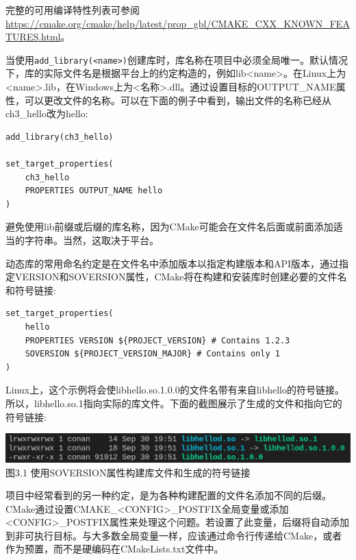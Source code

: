 完整的可用编译特性列表可参阅\url{https://cmake.org/cmake/help/latest/prop_gbl/CMAKE\_CXX\_KNOWN\_FEATURES.html}。


当使用\texttt{add\_library(<name>)}创建库时，库名称在项目中必须全局唯一。默认情况下，库的实际文件名是根据平台上的约定构造的，例如lib<name>。在Linux上为<name>.lib，在Windows上为<名称>.dll。通过设置目标的OUTPUT\_NAME属性，可以更改文件的名称。可以在下面的例子中看到，输出文件的名称已经从ch3\_hello改为hello:

\begin{lstlisting}[style=styleCMake]
add_library(ch3_hello)

set_target_properties(
	ch3_hello
	PROPERTIES OUTPUT_NAME hello
)
\end{lstlisting}

避免使用lib前缀或后缀的库名称，因为CMake可能会在文件名后面或前面添加适当的字符串。当然，这取决于平台。

动态库的常用命名约定是在文件名中添加版本以指定构建版本和API版本，通过指定VERSION和SOVERSION属性，CMake将在构建和安装库时创建必要的文件名和符号链接:

\begin{lstlisting}[style=styleCMake]
set_target_properties(
	hello
	PROPERTIES VERSION ${PROJECT_VERSION} # Contains 1.2.3
	SOVERSION ${PROJECT_VERSION_MAJOR} # Contains only 1
)
\end{lstlisting}

Linux上，这个示例将会使libhello.so.1.0.0的文件名带有来自libhello的符号链接。所以，libhello.so.1指向实际的库文件。下面的截图展示了生成的文件和指向它的符号链接:

\begin{center}
\includegraphics[width=1.\textwidth]{content/1/chapter3/images/1.jpg}\\
图3.1  使用SOVERSION属性构建库文件和生成的符号链接
\end{center}

项目中经常看到的另一种约定，是为各种构建配置的文件名添加不同的后缀。CMake通过设置CMAKE\_<CONFIG>\_POSTFIX全局变量或添加<CONFIG>\_POSTFIX属性来处理这个问题。若设置了此变量，后缀将自动添加到非可执行目标。与大多数全局变量一样，应该通过命令行传递给CMake，或者作为预置，而不是硬编码在CMakeLists.txt文件中。

